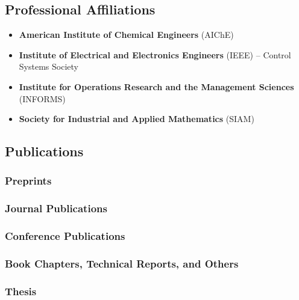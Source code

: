 \documentclass[letterpaper, 11pt]{article}
\begin{document}
\subsection*{Professional Affiliations}
\begin{itemize}[label=$\bullet$,itemsep=0pt]
\item {\bf American Institute of Chemical Engineers} (AIChE)
\item {\bf Institute of Electrical and Electronics Engineers} (IEEE) -- Control Systems Society
\item {\bf Institute for Operations Research and the Management Sciences} (INFORMS)
\item {\bf Society for Industrial and Applied Mathematics} (SIAM)
\end{itemize}
\let\OLDthebibliography\thebibliography
\renewcommand\thebibliography[1]{
  \OLDthebibliography{#1}
  \setlength{\parskip}{0pt}
  \setlength{\itemsep}{0pt}
}

\subsection*{Publications}
\subsubsection*{Preprints}
\renewcommand*{\labelenumi}{[P\theenumi]}
\subsubsection*{Journal Publications}
\renewcommand*{\labelenumi}{[J\theenumi]}
\subsubsection*{Conference Publications}
\renewcommand*{\labelenumi}{[C\theenumi]}
\subsubsection*{Book Chapters, Technical Reports, and Others}
\renewcommand*{\labelenumi}{[B\theenumi]}
\subsubsection*{Thesis}
\renewcommand*{\labelenumi}{[T\theenumi]}
\end{document}
